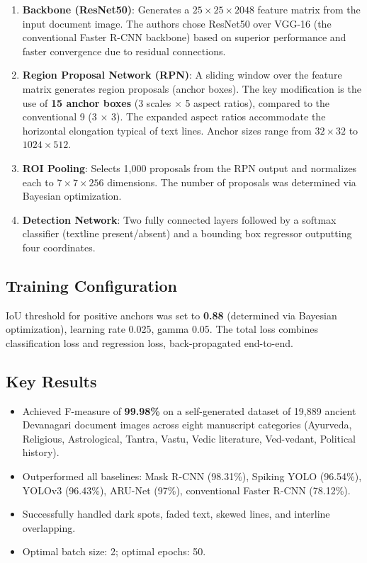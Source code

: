 \documentclass[11pt, a4paper]{article}
\begin{document}
\begin{enumerate}[leftmargin=1.5em]
    \item \textbf{Backbone (ResNet50)}: Generates a $25 \times 25 \times 2048$ feature matrix from the input document image. The authors chose ResNet50 over VGG-16 (the conventional Faster R-CNN backbone) based on superior performance and faster convergence due to residual connections.
    
    \item \textbf{Region Proposal Network (RPN)}: A sliding window over the feature matrix generates region proposals (anchor boxes). The key modification is the use of \textbf{15 anchor boxes} (3 scales $\times$ 5 aspect ratios), compared to the conventional 9 (3 $\times$ 3). The expanded aspect ratios accommodate the horizontal elongation typical of text lines. Anchor sizes range from $32\times32$ to $1024\times512$.
    
    \item \textbf{ROI Pooling}: Selects 1,000 proposals from the RPN output and normalizes each to $7\times7\times256$ dimensions. The number of proposals was determined via Bayesian optimization.
    
    \item \textbf{Detection Network}: Two fully connected layers followed by a softmax classifier (textline present/absent) and a bounding box regressor outputting four coordinates.
\end{enumerate}

\subsection{Training Configuration}

IoU threshold for positive anchors was set to \textbf{0.88} (determined via Bayesian optimization), learning rate 0.025, gamma 0.05. The total loss combines classification loss and regression loss, back-propagated end-to-end.

\subsection{Key Results}

\begin{itemize}[leftmargin=1.5em]
    \item Achieved F-measure of \textbf{99.98\%} on a self-generated dataset of 19,889 ancient Devanagari document images across eight manuscript categories (Ayurveda, Religious, Astrological, Tantra, Vastu, Vedic literature, Ved-vedant, Political history).
    \item Outperformed all baselines: Mask R-CNN (98.31\%), Spiking YOLO (96.54\%), YOLOv3 (96.43\%), ARU-Net (97\%), conventional Faster R-CNN (78.12\%).
    \item Successfully handled dark spots, faded text, skewed lines, and interline overlapping.
    \item Optimal batch size: 2; optimal epochs: 50.
\end{itemize}
\end{document}
